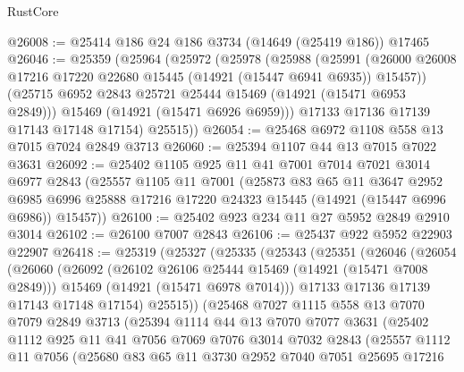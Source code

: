 \begin{lexlean}{RustCore}
\begin{coremodule}
@26008 := @25414 @186 @24 @186 @3734 (@14649 (@25419 @186)) @17465
@26046 := @25359
    (@25964
      (@25972
        (@25978
          (@25988
            (@25991
              (@26000 @26008 @17216 @17220 @22680 @15445 (@14921 (@15447 @6941 @6935)) @15457))
            (@25715 @6952 @2843 @25721 @25444 @15469 (@14921 (@15471 @6953 @2849)))
            @15469
            (@14921 (@15471 @6926 @6959)))
          @17133
          @17136
          @17139
          @17143
          @17148
          @17154)
        @25515))
@26054 := @25468 @6972 @1108 @558 @13 @7015 @7024 @2849 @3713
@26060 := @25394 @1107 @44 @13 @7015 @7022 @3631
@26092 := @25402
    @1105
    @925
    @11
    @41
    @7001
    @7014
    @7021
    @3014
    @6977
    @2843
    (@25557
      @1105
      @11
      @7001
      (@25873
        @83
        @65
        @11
        @3647
        @2952
        @6985
        @6996
        @25888
        @17216
        @17220
        @24323
        @15445
        (@14921 (@15447 @6996 @6986))
        @15457))
@26100 := @25402 @923 @234 @11 @27 @5952 @2849 @2910 @3014
@26102 := @26100 @7007 @2843
@26106 := @25437 @922 @5952 @22903 @22907
@26418 := @25319
    (@25327
      (@25335
        (@25343
          (@25351
            (@26046
              (@26054
                (@26060
                  (@26092
                    (@26102 @26106 @25444 @15469 (@14921 (@15471 @7008 @2849)))
                    @15469
                    (@14921 (@15471 @6978 @7014)))
                  @17133
                  @17136
                  @17139
                  @17143
                  @17148
                  @17154)
                @25515))
            (@25468
              @7027
              @1115
              @558
              @13
              @7070
              @7079
              @2849
              @3713
              (@25394
                @1114
                @44
                @13
                @7070
                @7077
                @3631
                (@25402
                  @1112
                  @925
                  @11
                  @41
                  @7056
                  @7069
                  @7076
                  @3014
                  @7032
                  @2843
                  (@25557
                    @1112
                    @11
                    @7056
                    (@25680
                      @83
                      @65
                      @11
                      @3730
                      @2952
                      @7040
                      @7051
                      @25695
                      @17216

\end{coremodule}
\end{lexlean}
